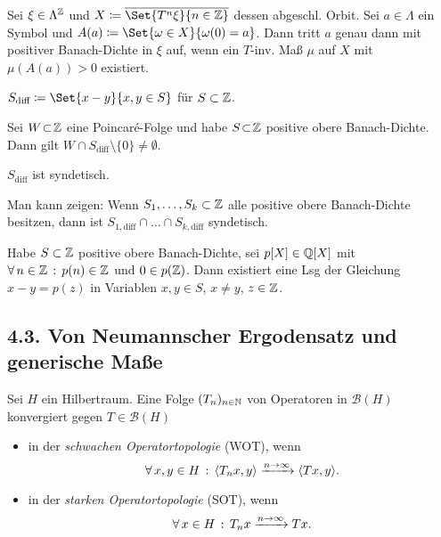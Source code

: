 \documentclass{cheat-sheet}
\newcommand{\clos}[1]{\overline{#1}} %
\newcommand{\Boun}{\mathcal{B}} %
\newcommand{\scp}[2]{\langle #1 , #2 \rangle} %
\begin{document}
\begin{lem}
  Sei $\xi \in \Lambda^{\mathbb{Z}}$ und $X \coloneqq \clos{\Set{T^n \xi}{n \in \Z}}$ dessen abgeschl. Orbit.
  Sei $a \in \Lambda$ ein Symbol und $A(a) \coloneqq \Set{\omega \in X}{\omega(0) = a}$.
  Dann tritt $a$ genau dann mit positiver Banach-Dichte in $\xi$ auf, wenn ein $T$-inv. Maß $\mu$ auf $X$ mit $\mu(A(a)) > 0$ existiert.
\end{lem}

\begin{nota}
  $S_{\text{diff}} \coloneqq \Set{x - y}{x, y \in S}$ für $S \subset \mathbb{Z}$.
\end{nota}

\begin{thm}
  Sei $W \!\subset\! \mathbb{Z}$ eine Poincaré-Folge und habe $S \!\subset\! \mathbb{Z}$ positive obere Banach-Dichte.
  Dann gilt
  $W \cap S_{\text{diff}} \setminus \{ 0 \} \neq \emptyset$.
\end{thm}

\begin{kor}
  $S_{\text{diff}}$ ist syndetisch.
\end{kor}

\begin{bem}
  Man kann zeigen: Wenn $S_1, \ldots, S_k \subset \mathbb{Z}$ alle positive obere Banach-Dichte besitzen, dann ist $S_{1,\text{diff}} \cap \ldots \cap S_{k,\text{diff}}$ syndetisch.
\end{bem}

\begin{thm}
  Habe $S \subset \mathbb{Z}$ positive obere Banach-Dichte, sei $p[X] \in \mathbb{Q}[X]$ mit $\forall \, {n \in \mathbb{Z}} \,:\, p(n) \in \mathbb{Z}$ und $0 \in p(\mathbb{Z})$.
  Dann existiert eine Lsg der Gleichung $x - y = p(z)$ in Variablen $x, y \in S$, $x \neq y$, $z \in \mathbb{Z}$.
\end{thm}

\begin{samepage}
  \section{4.3. Von Neumannscher Ergodensatz und generische Maße}
\end{samepage}

\begin{defn}
  Sei $H$ ein Hilbertraum. Eine Folge $(T_n)_{n \in \mathbb{N}}$ von Operatoren in $\Boun(H)$ konvergiert gegen $T \in \Boun(H)$
  \begin{itemize}
    \item in der \emph{schwachen Operatortopologie} (WOT), wenn
    \[ \fa{x, y \in H} \scp{T_n x}{y} \xrightarrow{n \to \infty} \scp{T x}{y}. \]
    \item in der \emph{starken Operatortopologie} (SOT), wenn
    \[ \forall \, {x \in H} \,:\, T_n x \xrightarrow{n \to \infty} T x. \]
  \end{itemize}
\end{defn}
\end{document}
